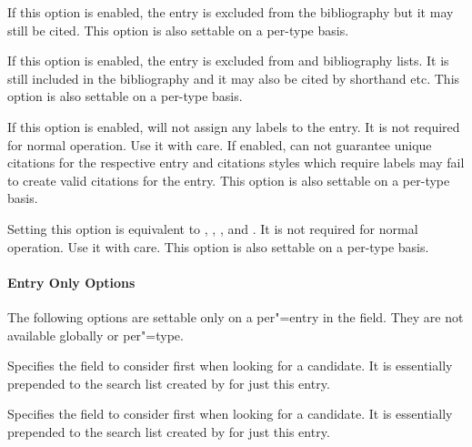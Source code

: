 \documentclass{ltxdockit}[2011/03/25]
\newcommand*{\biblatex}{\sty{biblatex}\xspace}
\begin{document}
\begin{optionlist}


If this option is enabled, the entry is excluded from the bibliography but it may still be cited.
This option is also settable on a per-type basis.


If this option is enabled, the entry is excluded from and bibliography lists. It is still included in the bibliography and it may also be cited by shorthand etc.
This option is also settable on a per-type basis.


If this option is enabled, \biblatex will not assign any labels to the entry. It is not required for normal operation. Use it with care. If enabled, \biblatex can not guarantee unique citations for the respective entry and citations styles which require labels may fail to create valid citations for the entry.
This option is also settable on a per-type basis.


Setting this option is equivalent to , , , and . It is not required for normal operation. Use it with care.
This option is also settable on a per-type basis.

\paragraph{Entry Only Options}
\label{use:opt:bib:entry}

The following options are settable only on a per"=entry in the  field. They are not available globally or per"=type.


Specifies the field to consider first when looking for a  candidate. It is essentially prepended to the search list created by  for just this entry.


Specifies the field to consider first when looking for a  candidate. It is essentially prepended to the search list created by  for just this entry.

\end{optionlist}
\end{document}
